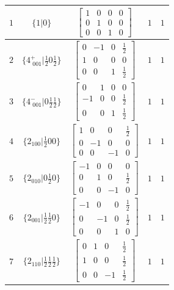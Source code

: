 \documentclass[fleqn,8pt]{jsarticle}
\begin{document}
\begin{longtable}{ccccc}
$ 1 $ & $ \{1|0\} $ & $ \begin{bmatrix} 1 & 0 & 0 & 0 \\ 0 & 1 & 0 & 0 \\ 0 & 0 & 1 & 0 \end{bmatrix} $ & $ 1 $ & $ 1 $ \\ \hline
$ 2 $ & $ \{4^{+}_{\,\,001}|\frac{1}{2} 0 \frac{1}{2}\} $ & $ \begin{bmatrix} 0 & -1 & 0 & \frac{1}{2} \\ 1 & 0 & 0 & 0 \\ 0 & 0 & 1 & \frac{1}{2} \end{bmatrix} $ & $ 1 $ & $ 1 $ \\ \hline
$ 3 $ & $ \{4^{-}_{\,\,001}|0 \frac{1}{2} \frac{1}{2}\} $ & $ \begin{bmatrix} 0 & 1 & 0 & 0 \\ -1 & 0 & 0 & \frac{1}{2} \\ 0 & 0 & 1 & \frac{1}{2} \end{bmatrix} $ & $ 1 $ & $ 1 $ \\ \hline
$ 4 $ & $ \{2{}_{100}|\frac{1}{2} 0 0\} $ & $ \begin{bmatrix} 1 & 0 & 0 & \frac{1}{2} \\ 0 & -1 & 0 & 0 \\ 0 & 0 & -1 & 0 \end{bmatrix} $ & $ 1 $ & $ 1 $ \\ \hline
$ 5 $ & $ \{2{}_{010}|0 \frac{1}{2} 0\} $ & $ \begin{bmatrix} -1 & 0 & 0 & 0 \\ 0 & 1 & 0 & \frac{1}{2} \\ 0 & 0 & -1 & 0 \end{bmatrix} $ & $ 1 $ & $ 1 $ \\ \hline
$ 6 $ & $ \{2{}_{001}|\frac{1}{2} \frac{1}{2} 0\} $ & $ \begin{bmatrix} -1 & 0 & 0 & \frac{1}{2} \\ 0 & -1 & 0 & \frac{1}{2} \\ 0 & 0 & 1 & 0 \end{bmatrix} $ & $ 1 $ & $ 1 $ \\ \hline
$ 7 $ & $ \{2{}_{110}|\frac{1}{2} \frac{1}{2} \frac{1}{2}\} $ & $ \begin{bmatrix} 0 & 1 & 0 & \frac{1}{2} \\ 1 & 0 & 0 & \frac{1}{2} \\ 0 & 0 & -1 & \frac{1}{2} \end{bmatrix} $ & $ 1 $ & $ 1 $ \\ \hline

\end{longtable}
\end{document}

